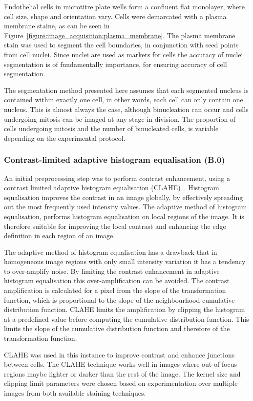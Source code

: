 Endothelial cells in microtitre plate wells form a confluent flat monolayer, where cell size, shape and orientation vary. Cells were demarcated with a plasma membrane staine, as can be seen in Figure~\ref{figure:image_acquisition:plasma_membrane}. The plasma membrane stain was used to segment the cell boundaries, in conjunction with seed points from cell nuclei. Since nuclei are used as markers for cells the accuracy of nuclei segmentation is of fundamentally importance, for ensuring accuracy of cell segmentation.

The segmentation method presented here assumes that each segmented nucleus is contained within exactly one cell, in other words, each cell can only contain one nucleus. This is almost always the case, although binucleation can occur and cells undergoing mitosis can be imaged at any stage in division. The proportion of cells undergoing mitosis and the number of binucleated cells, is variable depending on the experimental protocol.

\subsubsection{Contrast-limited adaptive histogram equalisation (B.0)}
An initial preprocessing step was to perform contrast enhancement, using a contrast limited adaptive histogram equalisation (CLAHE)~\cite{Ketcham1974}. Histogram equalisation improves the contrast in an image globally, by effectively spreading out the most frequently used intensity values. The adaptive method of histogram equalisation, performs histogram equalisation on local regions of the image. It is therefore suitable for improving the local contrast and enhancing the edge definition in each region of an image.

The adaptive method of histogram equalisation has a drawback that in homogeneous image regions with only small intensity variation it has a tendency to over-amplify noise. By limiting the contrast enhancement in adaptive histogram equalisation this over-amplification can be avoided. The contrast amplification is calculated for a pixel from the slope of the transformation function, which is proportional to the slope of the neighbourhood cumulative distribution function. CLAHE limits the amplification by clipping the histogram at a predefined value before computing the cumulative distribution function. This limits the slope of the cumulative distribution function and therefore of the transformation function.

CLAHE was used in this instance to improve contrast and enhance junctions between cells. The CLAHE technique works well in images where out of focus regions maybe lighter or darker than the rest of the image. The kernel size and clipping limit parameters were chosen based on experimentation over multiple images from both available staining techniques.

